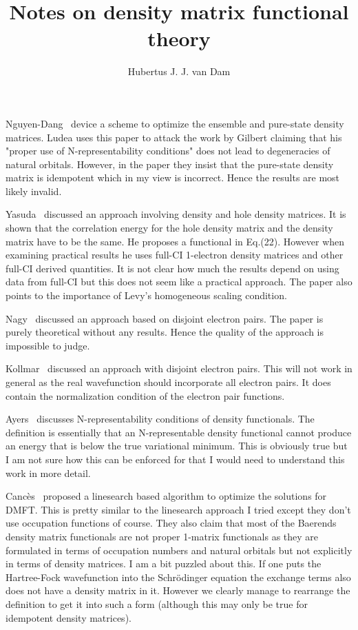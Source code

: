\documentclass{article}
\title{Notes on density matrix functional theory}
\author{Hubertus J. J. van Dam}
\begin{document}
\maketitle

Nguyen-Dang~\cite{Nguyen_Dang_1985} device a scheme to optimize the
ensemble and pure-state density matrices. Ludea uses this paper to
attack the work by Gilbert claiming that his "proper use of N-representability
conditions" does not lead to degeneracies of natural orbitals. However, in the
paper they insist that the pure-state density matrix is idempotent which in
my view is incorrect. Hence the results are most likely invalid.

Yasuda~\cite{Yasuda_2001} discussed an approach involving density and hole
density matrices. It is shown that the correlation energy for the hole density
matrix and the density matrix have to be the same. He proposes a functional in
Eq.(22). However when examining practical results he uses full-CI 1-electron
density matrices and other full-CI derived quantities. It is not clear how
much the results depend on using data from full-CI but this does not seem like
a practical approach. The paper also points to the importance of Levy's
homogeneous scaling condition.

Nagy~\cite{Nagy_2002} discussed an approach based on disjoint electron pairs.
The paper is purely theoretical without any results. Hence the quality of the
approach is impossible to judge.

Kollmar~\cite{Kollmar_2003} discussed an approach with disjoint electron pairs.
This will not work in general as the real wavefunction should incorporate all
electron pairs. It does contain the normalization condition of the electron
pair functions.

Ayers~\cite{Ayers_2007} discusses N-representability conditions of density
functionals. The definition is essentially that an N-representable density
functional cannot produce an energy that is below the true variational 
minimum. This is obviously true but I am not sure how this can be enforced
for that I would need to understand this work in more detail.

Canc\`{e}s~\cite{Cance_s_2008} proposed a linesearch based algorithm to 
optimize the solutions for DMFT. This is pretty similar to the linesearch 
approach I tried except they don't use occupation functions of course. 
They also claim that most of the Baerends density matrix functionals are not
proper 1-matrix functionals as they are formulated in terms of occupation
numbers and natural orbitals but not explicitly in terms of density matrices.
I am a bit puzzled about this. If one puts the Hartree-Fock wavefunction into
the Schr\"{o}dinger equation the exchange terms also does not have a density
matrix in it. However we clearly manage to rearrange the definition to get it
into such a form (although this may only be true for idempotent density
matrices).
\end{document}
